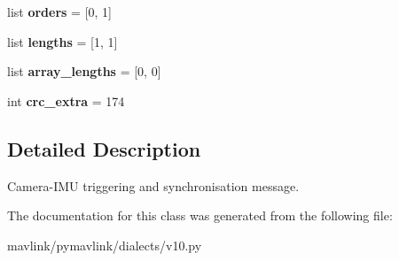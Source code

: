 \begin{DoxyCompactItemize}
\item 
\mbox{\label{classpymavlink_1_1dialects_1_1v10_1_1MAVLink__camera__trigger__message_a037da7435e59918534e9374804b56ab4}} 
list {\bfseries orders} = \mbox{[}0, 1\mbox{]}
\item 
\mbox{\label{classpymavlink_1_1dialects_1_1v10_1_1MAVLink__camera__trigger__message_a58207cd90257a56980e307403672bb92}} 
list {\bfseries lengths} = \mbox{[}1, 1\mbox{]}
\item 
\mbox{\label{classpymavlink_1_1dialects_1_1v10_1_1MAVLink__camera__trigger__message_a5d42e5c41d8bbf996073cd06e57e13d0}} 
list {\bfseries array\+\_\+lengths} = \mbox{[}0, 0\mbox{]}
\item 
\mbox{\label{classpymavlink_1_1dialects_1_1v10_1_1MAVLink__camera__trigger__message_aee6001605559006fa4c36a17aa1bc0b4}} 
int {\bfseries crc\+\_\+extra} = 174
\end{DoxyCompactItemize}


\subsection{Detailed Description}
\begin{DoxyVerb}Camera-IMU triggering and synchronisation message.
\end{DoxyVerb}
 

The documentation for this class was generated from the following file\+:\begin{DoxyCompactItemize}
\item 
mavlink/pymavlink/dialects/v10.\+py\end{DoxyCompactItemize}
